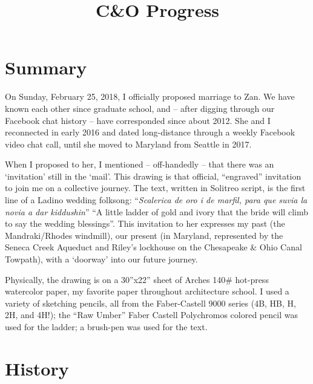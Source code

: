 ﻿\documentclass[letterpaper, 12pt, landscape]{ProgressBook}
\title{C\&O Progress}
\begin{document}
\fancyhead{} %
\cfoot{\makebox[\textwidth][c]{\thepage}}


\section*{Summary}

On Sunday, February 25, 2018, I officially
proposed marriage to Zan. We have known each other since graduate school, and –
after digging through our Facebook chat history – have corresponded since about
2012. She and I reconnected in early 2016 and dated long-distance through a
weekly Facebook video chat call, until she moved to Maryland from Seattle in
2017.

When I proposed to her, I mentioned – off-handedly – that there
was an `invitation' still in the ‘mail’. This drawing is that official,
``engraved'' invitation to join me on a collective journey. The text, written in
Solitreo script, is the first line of a Ladino wedding folksong:
``\textit{Scalerica de oro i de marfil, para que suvia la novia a dar kiddushin}''
``A little ladder of gold and ivory that the bride will climb to say the wedding blessings''.
This invitation to her expresses my past (the Mandraki/Rhodes
windmill), our present (in Maryland, represented by the Seneca Creek Aqueduct
and Riley’s lockhouse on the Chesapeake \& Ohio Canal Towpath), with a
‘doorway’ into our future journey.

Physically, the drawing is on a 30''x22'' sheet of Arches
140\# hot-press watercolor paper, my favorite paper throughout architecture
school. I used a variety of sketching pencils, all from the Faber-Castell 9000 series
(4B, HB, H, 2H, and 4H!); the ``Raw Umber'' Faber Castell Polychromos colored
pencil was used for the ladder; a brush-pen was used for the text.

\section*{History}
\end{document}
